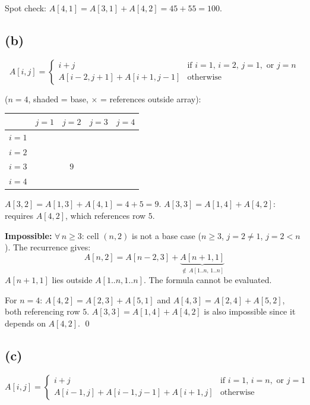 \documentclass[11pt]{article}
\newcommand{\bc}[1]{\cellcolor{gray!20}{#1}}
\newcommand{\pc}[1]{\cellcolor{red!15}{#1}}
\begin{document}
Spot check: $A[4,1] = A[3,1] + A[4,2] = 45 + 55 = 100$.

\subsection*{(b)}

\[
A[i,j] = \begin{cases}
i + j & \text{if } i = 1,\, i = 2,\, j = 1, \text{ or } j = n \\
A[i{-}2, j{+}1] + A[i{+}1, j{-}1] & \text{otherwise}
\end{cases}
\]

($n = 4$, \colorbox{gray!20}{shaded} = base, \colorbox{red!15}{$\times$} = references outside array):

\begin{center}
\renewcommand{\arraystretch}{1.3}
\begin{tabular}{c|cccc}
 & $j{=}1$ & $j{=}2$ & $j{=}3$ & $j{=}4$ \\ \hline
$i{=}1$ & \bc{$2$} & \bc{$3$} & \bc{$4$} & \bc{$5$} \\
$i{=}2$ & \bc{$3$} & \bc{$4$} & \bc{$5$} & \bc{$6$} \\
$i{=}3$ & \bc{$4$} & $9$ & \pc{$\times$} & \bc{$7$} \\
$i{=}4$ & \bc{$5$} & \pc{$\times$} & \pc{$\times$} & \bc{$8$}
\end{tabular}
\end{center}

$A[3,2] = A[1,3] + A[4,1] = 4 + 5 = 9$. \;
$A[3,3] = A[1,4] + A[4,2]$: requires $A[4,2]$, which references row $5$.

\textbf{Impossible:}
$\forall\, n \ge 3$: cell $(n, 2)$ is not a base case ($n \ge 3$, $j = 2 \ne 1$, $j = 2 < n$).
The recurrence gives:
\[
A[n, 2] = A[n{-}2, 3] + \underbrace{A[n{+}1, 1]}_{\notin\, A[1..n,\,1..n]}
\]
$A[n{+}1, 1]$ lies outside $A[1..n, 1..n]$. The formula cannot be evaluated.

For $n = 4$: $A[4,2] = A[2,3] + A[5,1]$ and $A[4,3] = A[2,4] + A[5,2]$, both referencing row $5$.
$A[3,3] = A[1,4] + A[4,2]$ is also impossible since it depends on $A[4,2]$. \qed

\subsection*{(c)}

\[
A[i,j] = \begin{cases}
i + j & \text{if } i = 1,\, i = n, \text{ or } j = 1 \\
A[i{-}1, j] + A[i{-}1, j{-}1] + A[i{+}1, j] & \text{otherwise}
\end{cases}
\]
\end{document}
